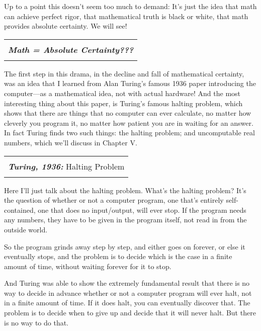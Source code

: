 \documentclass[12pt]{book}
\begin{document}
Up to a point this doesn't seem too much to demand: It's just the idea that math can
achieve perfect rigor, that mathematical truth is black or white, that math provides
absolute certainty.
We will see!  

\begin{center}
\begin{tabular}{|c|}
\hline
\\
\textbf{\emph{\large Math = Absolute Certainty???}}
\\
\\
\hline
\end{tabular}
\end{center}

The first step in this drama, in the decline and fall of mathematical certainty,
was an idea that I learned from Alan Turing's famous 1936 paper introducing the computer---as
a mathematical idea, not with actual hardware!  
And the most interesting thing about this paper, is Turing's
famous halting problem, which shows that there are things that no computer can ever
calculate, no matter how cleverly you program it, no matter how patient you are in waiting
for an answer.  In fact Turing finds two such things: the halting problem; 
and uncomputable real numbers, which we'll discuss in Chapter V.

\begin{center}
\begin{tabular}{|c|}
\hline
\\
\textbf{\emph{\large Turing, 1936:}} Halting Problem
\\
\\
\hline
\end{tabular}
\end{center}

Here I'll just talk about the halting problem.  What's the halting problem? It's the question
of whether or not a computer program, one that's entirely self-contained, one that does no
input/output, will ever stop.
If the program needs any numbers, they have to be given in the program itself, not read in from
the outside world.

So the program grinds away step by step, and either goes on forever, or else it eventually stops,
and the problem is to decide which is the case in a finite amount of time, without waiting
forever for it to stop.

And Turing was able to show the extremely fundamental result that there is no way to
decide in advance whether or not a computer program will ever halt, not in a finite amount of time.
If it does halt, you can eventually discover that. The problem is to decide when to give up
and decide that it will never halt. But there is no way to do that.
\end{document}
